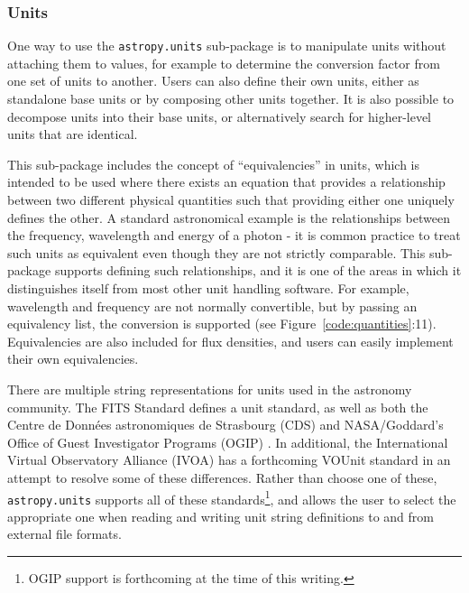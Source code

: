 \documentclass[traditabstract]{aa}
\begin{document}
\subsubsection{Units}

\label{sec:units}

One way to use the \texttt{astropy.units} sub-package is to manipulate units
without attaching them to values, for example to determine the conversion
factor from one set of units to another. Users can also define their own
units, either as standalone base units or by composing other units together.
It is also possible to decompose units into their base units, or alternatively
search for higher-level units that are identical.

This sub-package includes the concept of ``equivalencies'' in units, which is
intended to be used where there exists an equation that provides a
relationship between two different physical quantities such that providing
either one uniquely defines the other. A standard astronomical example is the
relationships between the frequency, wavelength and energy of a photon - it is
common practice to treat such units as equivalent even though they are not
strictly comparable. This sub-package supports defining such relationships,
and it is one of the areas in which it distinguishes itself from most other unit
handling software. For example, wavelength and frequency are not normally
convertible, but by passing an equivalency list, the conversion is supported
(see Figure~\ref{code:quantities}:11). Equivalencies are also included for flux
densities, and users can easily implement their own equivalencies.

There are multiple string representations for units used in the astronomy
community. The FITS Standard \cite{fits2008} defines a unit standard, as well
as both the Centre de Donn\'ees astronomiques de Strasbourg (CDS)
\citep{ochsenbein2000cds} and NASA/Goddard's Office of Guest Investigator
Programs (OGIP) \citep{george1995ogip}. In additional, the International
Virtual Observatory Alliance (IVOA) has a forthcoming VOUnit standard
\citep{derriere2012vounit} in an attempt to resolve some of these differences.
Rather than choose one of these, \texttt{astropy.units} supports all of these
standards\footnote{OGIP support is forthcoming at the time of this writing.},
and allows the user to select the appropriate one when reading and writing
unit string definitions to and from external file formats.
\end{document}
